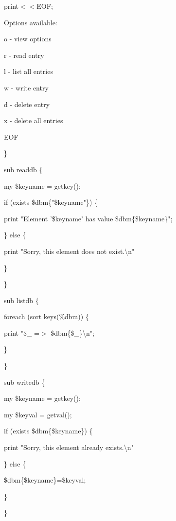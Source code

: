 \documentclass[a4paper,11pt]{book}
\begin{document}
\noindent print$<$$<$EOF;

\noindent Options available:

\noindent o - view options

\noindent r - read entry

\noindent l - list all entries

\noindent w - write entry

\noindent d - delete entry

\noindent x - delete all entries

\noindent EOF

\noindent \}

\noindent 

\noindent sub readdb \{

\noindent my \$keyname = getkey();

\noindent if (exists \$dbm\{"\$keyname"\}) \{

\noindent print "Element '\$keyname' has value \$dbm\{\$keyname\}";

\noindent \} else \{

\noindent print "Sorry, this element does not exist.\textbackslash n"

\noindent \}

\noindent \}

\noindent 

\noindent sub listdb \{

\noindent foreach (sort keys(\%dbm)) \{

\noindent print "\$\_  =$>$ \$dbm\{\$\_\}\textbackslash n";

\noindent \}

\noindent \}

\noindent 

\noindent 

\noindent sub writedb \{

\noindent my \$keyname = getkey();

\noindent my \$keyval = getval();

\noindent 

\noindent if (exists \$dbm\{\$keyname\}) \{

\noindent print "Sorry, this element already exists.\textbackslash n"

\noindent \} else \{

\noindent \$dbm\{\$keyname\}=\$keyval;

\noindent \}

\noindent \}

\noindent 
\end{document}
